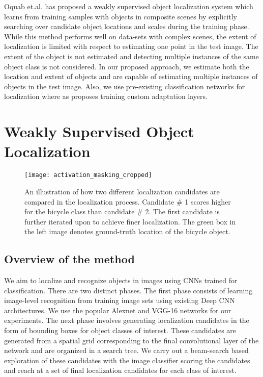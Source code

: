 \documentclass[runningheads]{llncs}
\begin{document}
 Oquab et.al. \cite{oquabobject} has proposed a weakly supervised object localization system which learns from training samples with objects in composite scenes by explicitly searching over candidate object locations and scales during the training phase. While this method performs well on data-sets with complex scenes, the extent of localization is limited with respect to estimating one point  in the test image. The extent of the object is not  estimated and detecting multiple instances of the same object class is not considered. In our proposed approach, we estimate both the location and extent of objects and are capable of estimating multiple instances of objects in the test image. Also, we use pre-existing classification networks for localization where as \cite{oquabobject} proposes training custom adaptation layers.

\section{Weakly Supervised Object Localization }\label{section:WeakSup}

\begin{figure*}
\begin{center}
\texttt{[image: activation\_masking\_cropped]}
\end{center}
   \caption{An illustration of how two different localization candidates are compared in the localization process. Candidate \# 1 scores higher for the bicycle class than candidate \# 2. The first candidate is further iterated upon to achieve finer localization. The green box in the left image denotes ground-truth location of the bicycle object.}
\label{fig:activation_masking_cropped}
\end{figure*}

\subsection{Overview of the method}
We aim to localize and recognize objects in images using CNNs trained for classification. There are two distinct phases. The first phase consists of learning image-level recognition from training image sets using existing Deep CNN architectures. We use the popular Alexnet \cite{krizhevsky2012imagenet} and VGG-16 \cite{simonyan2014very} networks for our experiments. The next phase involves generating localization candidates in the form of bounding boxes for object classes of interest. These candidates are generated from a spatial grid corresponding to the final convolutional layer of the network and are organized in a search tree. We carry out a beam-search based exploration of these candidates with the image classifier scoring the candidates and reach at a set of final localization candidates for each class of interest.
\end{document}

